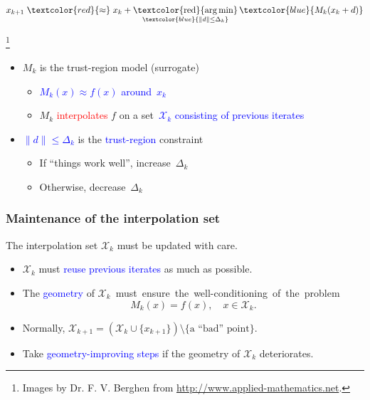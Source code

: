 \documentclass[slidestop,mathserif,xcolor=dvipsnames]{beamer}
\newcommand\blfootnote[1]{%
  \begingroup
  \renewcommand\thefootnote{}\footnote{#1}%
  \addtocounter{footnote}{-1}%
  \endgroup
}
\newcommand{\blue}[1]{\textcolor{blue}{#1}}
\newcommand{\red}[1]{\textcolor{red}{#1}}
\DeclareMathOperator*{\rargmin}{\textcolor{red}{arg\,min}}
\begin{document}
\begin{frame}
    \hspace{2.25cm}
    \begin{beamerboxesrounded}[width=7cm,shadow=true]{}
    \begin{equation*}
        x_{k+1} \;\red{\approx}\; x_k + \rargmin_{\blue{\|d\|\le \Delta_k}}
      \blue{M_k(x_k+d)}
    \end{equation*}
    \end{beamerboxesrounded}
    \blfootnote{Images by Dr. F. V. Berghen from \url{http://www.applied-mathematics.net}.}
    \vspace{0.2ex}
\begin{itemize}
  \item $M_k$ is the trust-region model  (surrogate)
    \begin{itemize}
        \item \blue{$M_k(x)\approx f(x)$ around~$x_k$}
        \item  $M_k$ \red{interpolates} $f$ on a set~\blue{$\mathcal{X}_k$ consisting of previous iterates}
    \end{itemize}
\vspace{0.6ex}
  \item \blue{$\|d\|\le\Delta_k$} is the \blue{trust-region} constraint
      \begin{itemize}
          \item If ``things work well'', increase~$\Delta_k$
          \item Otherwise, decrease~$\Delta_k$
          \end{itemize}
\end{itemize}

\end{frame}


\begin{frame}
    \frametitle{Maintenance of the interpolation set}
    \vspace{2ex}
    The interpolation set $\mathcal{X}_k$ must be updated with care.
    \vspace{1ex}
    \begin{itemize}
        \item $\mathcal{X}_k$ must \blue{reuse previous iterates} as much as possible.
    \vspace{1ex}
\item The \blue{geometry} of \mbox{$\mathcal{X}_k$ must ensure the well-conditioning of~the~problem}
            \[
                M_k(x) = f(x), \quad x \in \mathcal{X}_k.
            \]
\item Normally, $\mathcal{X}_{k+1} = \left(\mathcal{X}_{k}\cup\{x_{k+1}\}\right) \setminus\{\text{a ``bad'' point}\}$.
    \vspace{1ex}
\item Take \blue{geometry-improving steps} if the geometry of $\mathcal{X}_k$ deteriorates.
    \end{itemize}
\end{frame}
\end{document}
